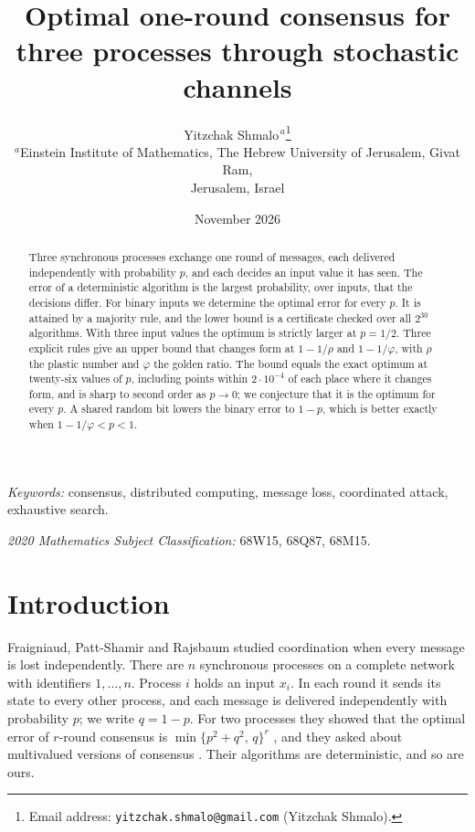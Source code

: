 \documentclass[11pt]{article}
\title{Optimal one-round consensus for three processes through stochastic channels}
\author{Yitzchak Shmalo$^{\,a}$\thanks{Email address:
\texttt{yitzchak.shmalo@gmail.com} (Yitzchak Shmalo).}\\
{\small $^{a}$Einstein Institute of Mathematics, The Hebrew University of
Jerusalem, Givat Ram,}\\
{\small Jerusalem, Israel}}
\date{November 2026}
\theoremstyle{remark}
\begin{document}
\maketitle

\begin{abstract}
Three synchronous processes exchange one round of messages, each delivered independently with probability $p$, and each decides an input value it has seen. The error of a deterministic algorithm is the largest probability, over inputs, that the decisions differ. For binary inputs we determine the optimal error for every $p$. It is attained by a majority rule, and the lower bound is a certificate checked over all $2^{30}$ algorithms. With three input values the optimum is strictly larger at $p=1/2$. Three explicit rules give an upper bound that changes form at $1-1/\rho$ and $1-1/\varphi$, with $\rho$ the plastic number and $\varphi$ the golden ratio. The bound equals the exact optimum at twenty-six values of $p$, including points within $2\cdot10^{-4}$ of each place where it changes form, and is sharp to second order as $p\to0$; we conjecture that it is the optimum for every $p$. A shared random bit lowers the binary error to $1-p$, which is better exactly when $1-1/\varphi<p<1$.
\end{abstract}

\noindent\textit{Keywords:} consensus, distributed computing, message loss, coordinated attack, exhaustive search.

\noindent\textit{2020 Mathematics Subject Classification:} 68W15, 68Q87, 68M15.

\section{Introduction}\label{sec:intro}

Fraigniaud, Patt-Shamir and Rajsbaum \cite{FPR} studied coordination when every message is lost independently. There are $n$ synchronous processes on a complete network with identifiers $1,\dots,n$. Process $i$ holds an input $x_i$. In each round it sends its state to every other process, and each message is delivered independently with probability $p$; we write $q=1-p$. For two processes they showed that the optimal error of $r$-round consensus is $\min\{p^2+q^2,\,q\}^r$ \cite[Corollary~17]{FPR}, and they asked about multivalued versions of consensus \cite[Section~7]{FPR}. Their algorithms are deterministic, and so are ours.
\end{document}
